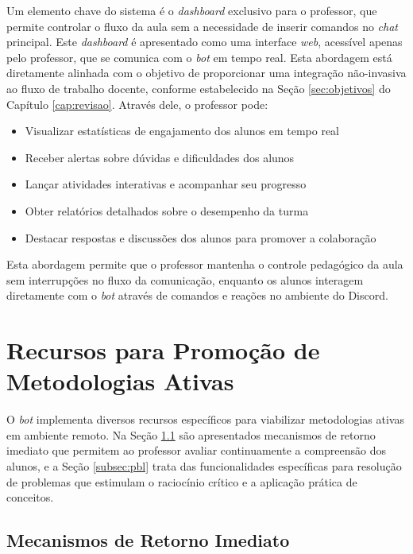 Um elemento chave do sistema é o \textit{dashboard} exclusivo para o professor,
que permite controlar o fluxo da aula sem a necessidade de inserir comandos no
\textit{chat} principal. Este \textit{dashboard} é apresentado como uma
interface \textit{web}, acessível apenas pelo professor, que se comunica com o
\textit{bot} em tempo real. Esta abordagem está diretamente alinhada com o
objetivo de proporcionar uma integração não-invasiva ao fluxo de trabalho
docente, conforme estabelecido na Seção \ref{sec:objetivos} do Capítulo
\ref{cap:revisao}. Através dele, o professor pode:

\begin{itemize}
\item Visualizar estatísticas de engajamento dos alunos em tempo real
\item Receber alertas sobre dúvidas e dificuldades dos alunos
\item Lançar atividades interativas e acompanhar seu progresso
\item Obter relatórios detalhados sobre o desempenho da turma
\item Destacar respostas e discussões dos alunos para promover a colaboração
\end{itemize}

Esta abordagem permite que o professor mantenha o controle pedagógico da aula
sem interrupções no fluxo da comunicação, enquanto os alunos interagem
diretamente com o \textit{bot} através de comandos e reações no ambiente do
Discord.

\section{Recursos para Promoção de Metodologias Ativas}
\label{sec:recursos}

O \textit{bot} implementa diversos recursos específicos para viabilizar
metodologias ativas em ambiente remoto. Na Seção \ref{subsec:feedback} são
apresentados mecanismos de retorno imediato que permitem ao professor avaliar 
continuamente a compreensão dos alunos, e a Seção \ref{subsec:pbl} trata das 
funcionalidades específicas para resolução de problemas que estimulam o 
raciocínio crítico e a aplicação prática de conceitos.

\subsection{Mecanismos de Retorno Imediato}
\label{subsec:feedback}


